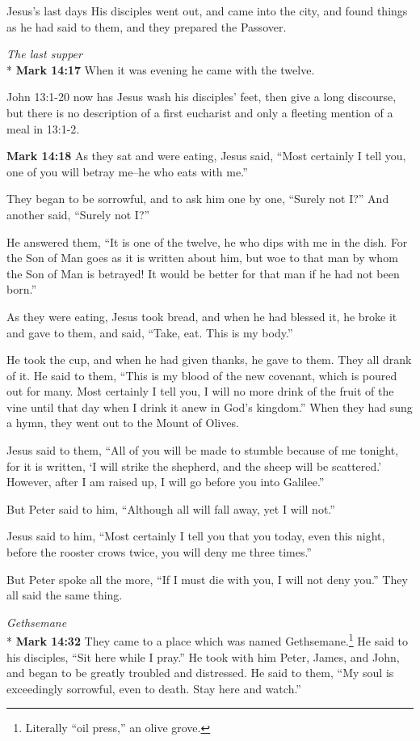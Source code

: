 \documentclass[10pt,twoside]{article} %
\newcommand{\doimage}[2]{\texttt{[image: \#2]}\label{fig:#2}}
\newcommand{\figbasic}[4]{ %
    \ifthenelse{\isodd{\pageref{fig:#2}}}{}{\hfill}
    \ifstrempty{#3}{
      \doimage{#1}{#2}
    }{
      \makebox{\doimage{#1}{#2} \\ #3}
    }
    \ifthenelse{\isodd{\pageref{fig:#2}}}{\hfill}{}
    \par
}
\newcommand{\fig}[2][0.4]{
  \figbasic{#1}{#2}{}{}
}
\newcommand{\quotesize}{\normalsize{}}
\newcommand{\comm}[1]{\begingroup \color{black!50} #1\endgroup}
\newenvironment{quotetext}{\begingroup\quotesize}{\endgroup}
\newcommand{\intex}[1]{\index[texts]{#1}}
\newcommand{\bible}[2]{\begin{quotetext}\textbf{#1}\intex{#1} #2\end{quotetext}}
\newcommand{\gospelmark}[2]{\bible{Mark #1}{#2}}
\newcommand{\subhead}[1]{\emph{#1}\\*}
\begin{document}
\begin{section}{Jesus's last days}
{  His disciples went out, and came into the city, and found things as he had said to them, and they prepared the Passover. 
}

\fig[1]{last-supper}

\subhead{The last supper}
\gospelmark{14:17}{
When it was evening he came with the twelve.}

\comm{John 13:1-20 now has Jesus wash his disciples' feet, then give a long discourse, but there is no description of
a first eucharist and only a fleeting mention of a meal in 13:1-2.}

\gospelmark{14:18}{
     As they sat and were eating, Jesus said, ``Most certainly I tell you, one of you will betray me--he who eats with me.''

  They began to be sorrowful, and to ask him one by one, ``Surely not I?'' And another said, ``Surely not I?''

  He answered them, ``It is one of the twelve, he who dips with me in the dish.    For the Son of Man goes as it is written about him, but woe to that man by whom the Son of Man is betrayed! It would be better for that man if he had not been born.''

  As they were eating, Jesus took bread, and when he had blessed it, he broke it and gave to them, and said, ``Take, eat. This is my body.''

  He took the cup, and when he had given thanks, he gave to them. They all drank of it.   He said to them, ``This is my blood of the new covenant, which is poured out for many.    Most certainly I tell you, I will no more drink of the fruit of the vine until that day when I drink it anew in God's kingdom.''   When they had sung a hymn, they went out to the Mount of Olives.

  Jesus said to them, ``All of you will be made to stumble because of me tonight, for it is written, `I will strike the shepherd, and the sheep will be scattered.'    However, after I am raised up, I will go before you into Galilee.''

  But Peter said to him, ``Although all will fall away, yet I will not.''

  Jesus said to him, ``Most certainly I tell you that you today, even this night, before the rooster crows twice, you will deny me three times.''

  But Peter spoke all the more, ``If I must die with you, I will not deny you.'' They all said the same thing.
}

\subhead{Gethsemane}
\gospelmark{14:32}{
  They came to a place which was named Gethsemane.\footnote{Literally ``oil press,'' an olive grove.}
He said to his disciples, ``Sit here while I pray.''   He took with him Peter, James, and John, and began to be greatly troubled and distressed.   He said to them, ``My soul is exceedingly sorrowful, even to death. Stay here and watch.''

}
\end{section}
\end{document}
